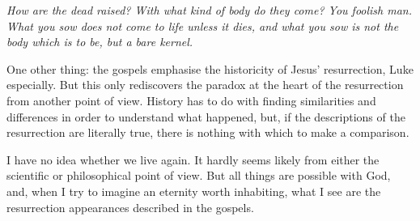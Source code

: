 \textit{How are the dead raised? With what kind of body do they come? You foolish man. What you sow does not come to life unless it dies, and what you sow is not the body which is to be, but a bare kernel.}

One other thing: the gospels emphasise the historicity of Jesus' resurrection, Luke especially. But this only rediscovers the paradox at the heart of the resurrection from another point of view. History has to do with finding similarities and differences in order to understand what happened, but, if the descriptions of the resurrection are literally true, there is nothing with which to make a comparison.

\prosesep

I have no idea whether we live again. It hardly seems likely from either the scientific or philosophical point of view. But all things are possible with God, and, when I try to imagine an eternity worth inhabiting, what I see are the resurrection appearances described in the gospels.
